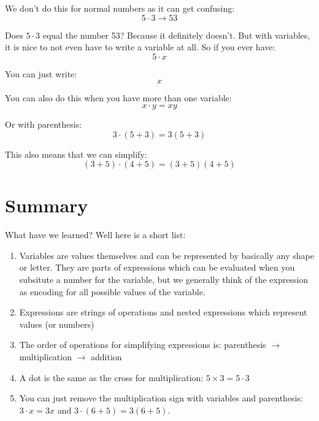 \documentclass{article}
\begin{document}
We don't do this for normal numbers as it can get confusing: 
\[ 5 \cdot 3 \to 53 \]

Does $5 \cdot 3$ equal the number 53? Because it definitely doesn't. But with variables, it is nice to not even have to write a variable at all. So if you ever have:
\[ 5 \cdot x \]

You can just write:
\[ x \]

You can also do this when you have more than one variable: 
\[ x \cdot y = xy \]

Or with parenthesis: 
\[ 3 \cdot (5 + 3) = 3(5 + 3) \]

This also means that we can simplify:
\[ (3 + 5) \cdot (4 + 5) = (3+5)(4+5) \]


\section*{Summary}

What have we learned? Well here is a short list: 
\begin{enumerate}
    \item Variables are values themselves and can be represented by basically any shape or letter. They are parts of expressions which can be evaluated when you subsitute a number for the variable, but we generally think of the expression as encoding for all possible values of the variable. 
    \item Expressions are strings of operations and nested expressions which represent values (or numbers)
    \item The order of operations for simplifying expressions is: parenthesis $\to$ multiplication $\to$ addition
    \item A dot is the same as the cross for multiplication: $5 \times 3 = 5 \cdot 3$
    \item You can just remove the multiplication sign with variables and parenthesis: $3 \cdot x = 3x$ and $3 \cdot (6 +5) = 3(6+5)$. 
\end{enumerate}
\end{document}
